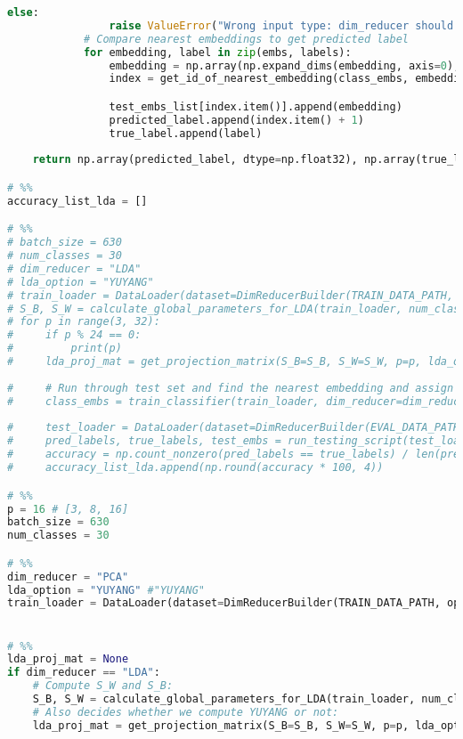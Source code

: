 \documentclass{article}
\begin{document}
\begin{lstlisting}[language=Python]
            else:
                raise ValueError("Wrong input type: dim_reducer should be PCA or LDA")
            # Compare nearest embeddings to get predicted label
            for embedding, label in zip(embs, labels):
                embedding = np.array(np.expand_dims(embedding, axis=0), dtype=np.float32)
                index = get_id_of_nearest_embedding(class_embs, embedding, num_classes, num_samples)

                test_embs_list[index.item()].append(embedding)
                predicted_label.append(index.item() + 1)
                true_label.append(label)
                
    return np.array(predicted_label, dtype=np.float32), np.array(true_label, dtype=np.float32), test_embs_list

# %%
accuracy_list_lda = []

# %%
# batch_size = 630
# num_classes = 30
# dim_reducer = "LDA"
# lda_option = "YUYANG"
# train_loader = DataLoader(dataset=DimReducerBuilder(TRAIN_DATA_PATH, option="bw"), batch_size=batch_size, shuffle=False)
# S_B, S_W = calculate_global_parameters_for_LDA(train_loader, num_classes=num_classes, feature_dim=4096)
# for p in range(3, 32):
#     if p % 24 == 0:
#         print(p)
#     lda_proj_mat = get_projection_matrix(S_B=S_B, S_W=S_W, p=p, lda_option=lda_option)
    
#     # Run through test set and find the nearest embedding and assign that label to the image
#     class_embs = train_classifier(train_loader, dim_reducer=dim_reducer, p=p, num_classes=num_classes, lda_proj_mat=lda_proj_mat)
    
#     test_loader = DataLoader(dataset=DimReducerBuilder(EVAL_DATA_PATH, option="bw"), batch_size=batch_size, shuffle=False)
#     pred_labels, true_labels, test_embs = run_testing_script(test_loader, lda_proj_mat, class_embs, dim_reducer=dim_reducer)
#     accuracy = np.count_nonzero(pred_labels == true_labels) / len(pred_labels)
#     accuracy_list_lda.append(np.round(accuracy * 100, 4))

# %%
p = 16 # [3, 8, 16]
batch_size = 630
num_classes = 30

# %%
dim_reducer = "PCA"
lda_option = "YUYANG" #"YUYANG"
train_loader = DataLoader(dataset=DimReducerBuilder(TRAIN_DATA_PATH, option="bw"), batch_size=batch_size, shuffle=False)


# %%
lda_proj_mat = None
if dim_reducer == "LDA":
    # Compute S_W and S_B:
    S_B, S_W = calculate_global_parameters_for_LDA(train_loader, num_classes=num_classes, feature_dim=4096)
    # Also decides whether we compute YUYANG or not:
    lda_proj_mat = get_projection_matrix(S_B=S_B, S_W=S_W, p=p, lda_option=lda_option)


\end{lstlisting}
\end{document}
